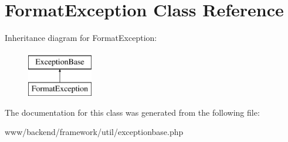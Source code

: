 \hypertarget{classFormatException}{
\section{FormatException Class Reference}
\label{classFormatException}
}
Inheritance diagram for FormatException:\begin{figure}[H]
\begin{center}
\leavevmode
\includegraphics[height=2.000000cm]{classFormatException}
\end{center}
\end{figure}


The documentation for this class was generated from the following file:\begin{DoxyCompactItemize}
\item 
www/backend/framework/util/exceptionbase.php\end{DoxyCompactItemize}

